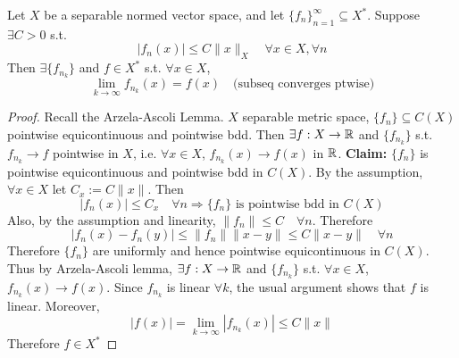 \begin{thm}
    Let $X$ be a separable normed vector space, and let $\{f_{n}\}_{n=1}^{\infty} \subseteq X^*$.
    Suppose $\exists C > 0$ s.t.
    \[
        \left| f_n(x) \right| \leq C \| x \|_X \quad \forall x \in X, \forall n
    \]  
    Then $\exists \{f_{n_k}\}$ and $f \in X^*$ s.t. $\forall x \in X$,
    \[
        \lim_{k \to \infty} f_{n_k}(x) = f(x) \quad \text{(subseq converges ptwise)}
    \]    
\end{thm}
\begin{proof}
    Recall the Arzela-Ascoli Lemma. $X$ separable metric space, $\{f_n\} \subseteq C(X)$
    pointwise equicontinuous and pointwise bdd. Then $\exists f : X \to \mathbb{R}$ and $\{f_{n_k}\}$
    s.t. $f_{n_k} \to f$ pointwise in $X$, i.e. $\forall x \in X$, $f_{n_k}(x) \to f(x)$ in $\mathbb{R}$.
    \newline\textbf{Claim:} $\{f_n\}$ is pointwise equicontinuous and pointwise bdd in $C(X)$.
    \newline \noindent By the assumption, $\forall x \in X$ let $C_x := C \| x \| $. Then
    \[
        \left| f_n(x) \right| \leq C_x \quad \forall n \Rightarrow \{f_n\} \text{ is pointwise bdd in } C(X)
    \]   
    Also, by the assumption and linearity, $\| f_n \| \leq C \quad \forall n$. Therefore
    \[
        \left| f_n(x) - f_n(y) \right| \leq \| f_n \| \| x - y \| \leq C \| x - y \| \quad \forall n   
    \] 
    Therefore $\{f_n \}$ are uniformly and hence pointwise equicontinuous in $C(X)$.
    Thus by Arzela-Ascoli lemma, $\exists f : X \to \mathbb{R}$ and $\{f_{n_k}\}$ s.t.
    $\forall x \in X$, $f_{n_k}(x) \to f(x)$. Since $f_{n_k}$ is linear $\forall k$, 
    the usual argument shows that $f$ is linear. Moreover, 
    \[
        \left| f(x) \right| = \lim_{k \to \infty} \left| f_{n_k}(x) \right| \leq C \| x \| 
    \]          
    Therefore $f \in X^*$ \qedhere
\end{proof}

